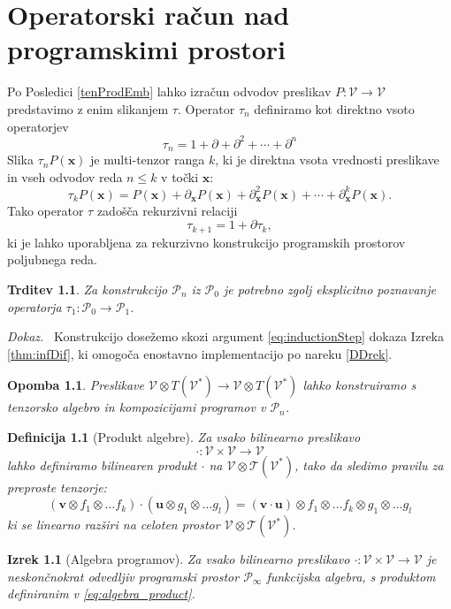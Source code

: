 \documentclass[a4paper, 12pt]{book}
\newcommand{\T}{\mathcal{T}}
\newcommand{\VV}{\mathcal{V}}
\newcommand{\x}{\mathbf{x}}
\newcommand{\uu}{\mathbf{u}}
\newcommand{\vv}{\mathbf{v}}
\newcommand{\dP}{\mathcal{P}}
\newcommand{\D}{\partial}
\newcommand{\sumd}{\tau}
\newtheorem{izrek}{Izrek}[chapter]
\newtheorem{opomba}{Opomba}[chapter]
\newtheorem{definicija}{Definicija}[chapter]
\newtheorem{trditev}{Trditev}[izrek]
\newenvironment{dokaz}{\emph{Dokaz.}\ }{\hspace{\fill}{$\Box$}}
\begin{document}
\chapter{Operatorski račun nad programskimi prostori}\label{ch:opRac}

Po Posledici \ref{tenProdEmb} lahko izračun odvodov preslikav $P:\VV\to\VV$ predstavimo z enim slikanjem $\sumd$. Operator $\sumd_n$ definiramo kot direktno vsoto operatorjev
\begin{equation}
\label{tau}
\sumd_n=1+\D+\D^2+\cdots+\D^n
\end{equation}
Slika $\sumd_n P(\x)$ je multi-tenzor ranga $k$, ki je direktna vsota vrednosti preslikave in vseh odvodov reda $n\le k$ v točki $\x$:
\begin{equation}
  \label{eq:multi_odvod}
  \sumd_kP(\x) = P(\mathbf{x})+\partial_\mathbf{x} P(\mathbf{x}) + \partial^2_\mathbf{x} P(\mathbf{x}) + \cdots + \partial^k_\mathbf{x} P(\mathbf{x}).
\end{equation}
Tako operator $\tau$ zadošča rekurzivni relaciji
\begin{equation}\label{DDrek}
\sumd_{k+1}=1+\D\sumd_k,
\end{equation}
ki je lahko uporabljena za rekurzivno konstrukcijo programskih prostorov poljubnega reda.

\begin{trditev}\label{impl}
Za konstrukcijo $\dP_n$ iz $\dP_0$ je potrebno zgolj eksplicitno poznavanje operatorja $\sumd_1:\dP_0\to\dP_1$.
\end{trditev}
\begin{dokaz}
Konstrukcijo dosežemo skozi argument \eqref{eq:inductionStep} dokaza Izreka \ref{thm:infDif}, ki omogoča enostavno implementacijo po nareku \eqref{DDrek}.
\end{dokaz}
\begin{opomba}
Preslikave $\VV\otimes T(\VV^*)\to\VV\otimes T(\VV^*)$ lahko konstruiramo s tenzorsko algebro in kompozicijami programov v $\dP_n$.
\end{opomba}

\begin{definicija}[Produkt algebre]
 Za vsako bilinearno preslikavo $$\cdot :\VV\times \VV\to \VV$$ lahko definiramo bilinearen produkt $\cdot$ na $\VV\otimes \T(\VV^*)$, tako da sledimo pravilu za preproste tenzorje:
 \begin{equation}
   \label{eq:algebra_product}
   (\vv\otimes f_1\otimes\ldots f_k) \cdot (\uu\otimes g_1\otimes\ldots g_l)=
(\vv\cdot \uu)\otimes f_1\otimes\ldots f_k\otimes g_1\otimes\ldots g_l 
 \end{equation}
ki se linearno razširi na celoten prostor $\VV\otimes\T(\VV^*)$.
\end{definicija}
\begin{izrek}[Algebra programov]\label{izr:alg}
 Za vsako bilinearno preslikavo $\cdot :\VV\times \VV\to \VV$ je neskončnokrat odvedljiv programski prostor $\dP_\infty$ funkcijska algebra, s produktom definiranim v \eqref{eq:algebra_product}.
\end{izrek}
\end{document}
